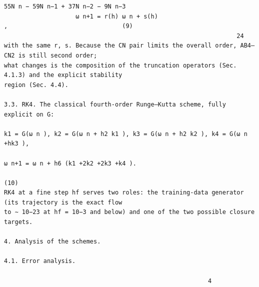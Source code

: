 \documentclass[letterpaper]{article}
\begin{document}
\begin{Verbatim}[fontsize=\fontsize{6.35}{7.15}\selectfont,breaklines=false]
                                                 55N n − 59N n−1 + 37N n−2 − 9N n−3
                    ω n+1 = r(h) ω n + s(h)                                         ,                                (9)
                                                                 24
with the same r, s. Because the CN pair limits the overall order, AB4–CN2 is still second order;
what changes is the composition of the truncation operators (Sec. 4.1.3) and the explicit stability
region (Sec. 4.4).

3.3. RK4. The classical fourth-order Runge–Kutta scheme, fully explicit on G:

k1 = G(ω n ), k2 = G(ω n + h2 k1 ), k3 = G(ω n + h2 k2 ), k4 = G(ω n +hk3 ),
                                                                           ω n+1 = ω n + h6 (k1 +2k2 +2k3 +k4 ).
                                                                                                  (10)
RK4 at a fine step hf serves two roles: the training-data generator (its trajectory is the exact flow
to ∼ 10−23 at hf = 10−3 and below) and one of the two possible closure targets.

4. Analysis of the schemes.

4.1. Error analysis.

                                                         4
\end{Verbatim}
\newpage
\end{document}
